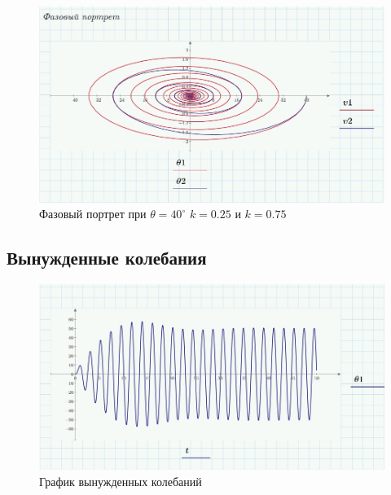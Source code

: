 \documentclass[a4paper, 14pt]{extarticle}
\begin{document}
		\begin{figure}[H]
			\centering
			\includegraphics[width = \linewidth]{15.jpg}
			\caption[.] {Фазовый портрет при $\theta = 40^{\circ}$ $k = 0.25$ и $k=0.75$}
		\end{figure}
	\pagebreak
	\subsection{Вынужденные колебания}
		\begin{figure}[H]
			\centering
			\includegraphics[width = \linewidth]{17.jpg}
			\caption[.] {График вынужденных колебаний}
		\end{figure}
\end{document}
